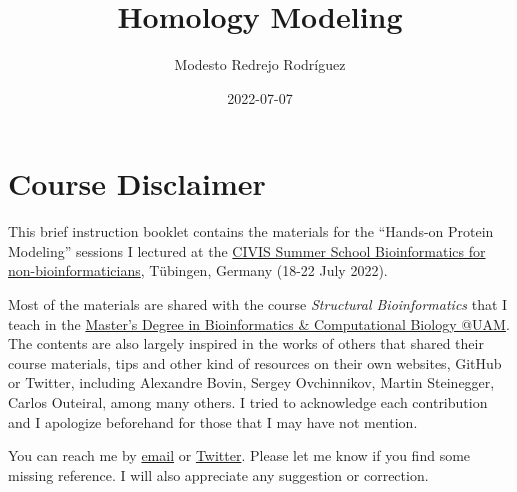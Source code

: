 \documentclass[
  letterpaper,
  DIV=11,
  numbers=noendperiod]{scrreprt}
\title{Homology Modeling}
\author{Modesto Redrejo Rodríguez}
\date{2022-07-07}
\renewcommand*\contentsname{Table of contents}
\newcommand\contentsname{Table of contents}
\begin{document}
\maketitle

\ifdefined\Shaded\renewenvironment{Shaded}{\begin{tcolorbox}[breakable, boxrule=0pt, interior hidden, sharp corners, frame hidden, borderline west={3pt}{0pt}{shadecolor}, enhanced]}{\end{tcolorbox}}\fi

\renewcommand*\contentsname{Table of contents}
{
\hypersetup{linkcolor=}
\setcounter{tocdepth}{2}
\tableofcontents
}
\hypertarget{course-disclaimer}{%
\chapter{Course Disclaimer}\label{course-disclaimer}}

This brief instruction booklet contains the materials for the ``Hands-on
Protein Modeling'' sessions I lectured at the
\href{https://civis.eu/en/civis-courses/bioinformatics-for-non-bioinformaticians-computational-analyses-in-health-and-life-sciences}{CIVIS
Summer School Bioinformatics for non-bioinformaticians}, Tübingen,
Germany (18-22 July 2022).

Most of the materials are shared with the course \emph{Structural
Bioinformatics} that I teach in the
\href{https://www-uam-es.translate.goog/Medicina/MasterBioinformaticaBiologiaComputacional/1446820907497.htm?language=es\&nodepath=M?ster+Universitario+en+Bioinform?tica+y+Biolog?a+Computacional\&_x_tr_sl=es\&_x_tr_tl=en\&_x_tr_hl=es\&_x_tr_pto=wapp}{Master's
Degree in Bioinformatics \& Computational Biology @UAM}. The contents
are also largely inspired in the works of others that shared their
course materials, tips and other kind of resources on their own
websites, GitHub or Twitter, including Alexandre Bovin, Sergey
Ovchinnikov, Martin Steinegger, Carlos Outeiral, among many others. I
tried to acknowledge each contribution and I apologize beforehand for
those that I may have not mention.

You can reach me by \href{mailto::modesto.redrejo@uam.es}{email} or
\href{https://twitter.com/mredrejo}{Twitter}. Please let me know if you
find some missing reference. I will also appreciate any suggestion or
correction.
\end{document}
